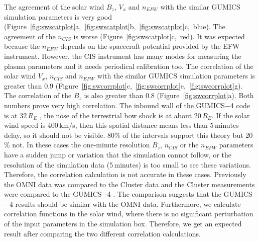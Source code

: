 \documentclass[linenumbers,draft]{agujournal}
\begin{document}
The agreement of the solar wind $B_{z}$, $V_{x}$ and $n_{EFW}$ with the similar GUMICS simulation parameters is very good (Figure~\ref{fig:swscatplot}a,~\ref{fig:swscatplot}b,~\ref{fig:swscatplot}c,~blue). The agreement of the $n_{CIS}$ is worse (Figure~\ref{fig:swscatplot}c,~red). It was expected because the $n_{EFW}$ depends on the spacecraft potential provided by the EFW instrument. However, the CIS instrument has many modes for measuring the plasma parameters and it needs periodical calibration too. The correlation of the solar wind $V_{x}$,  $n_{CIS}$ and $n_{EFW}$ with the similar GUMICS simulation parameters is greater than 0.9 (Figure~\ref{fig:swcorrplot}c,~\ref{fig:swcorrplot}e,~\ref{fig:swcorrplot}g). The correlation of the $B_{z}$ is also greater than 0.8 (Figure~\ref{fig:swcorrplot}a). Both numbers prove very high correlation. The inbound wall of the GUMICS$-$4 code is at $32\,R_E$ \citep{janhunen12:_gumic_mhd}, the nose of the terrestrial bow shock is at about $20\,R_E$. If the solar wind speed is 400\,km/s, then this spatial distance means less than 5\,minutes delay, so it should not be visible. 80\% of the intervals support this theory but 20\,\% not. In these cases the one-minute resolution $B_z$, $n_{CIS}$ or the $n_{EFW}$ parameters have a sudden jump or variation that the simulation cannot follow, or the resolution of the simulation data (5\,minutes) is too small to see these variations. Therefore, the correlation calculation is not accurate in these cases. Previously the OMNI data was compared to the Cluster data and the Cluster measurements were compared to the GUMICS$-$4 \citep{facsko16:_one_earth}. The comparison suggests that the GUMICS$-$4 results should be similar with the OMNI data. Furthermore, we calculate correlation functions in the solar wind, where there is no significant perturbation of the input parameters in the simulation box. Therefore, we get an expected result after comparing the two different correlation calculations.
\end{document}
